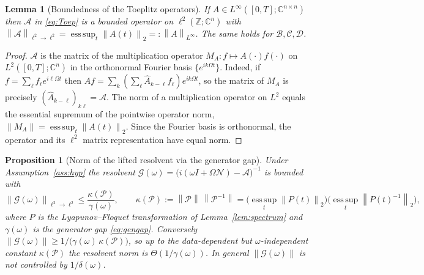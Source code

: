 \documentclass{amsart}
\newtheorem{lemma}{Lemma}
\newtheorem{proposition}{Proposition}
\theoremstyle{definition}
\newcommand{\C}{\mathbb{C}}
\newcommand{\Z}{\mathbb{Z}}
\newcommand{\norm}[1]{\left\lVert#1\right\rVert}
\newcommand{\Acal}{\mathcal{A}}
\newcommand{\Bcal}{\mathcal{B}}
\newcommand{\Ccal}{\mathcal{C}}
\newcommand{\Dcal}{\mathcal{D}}
\newcommand{\Ncal}{\mathcal{N}}
\begin{document}
\begin{lemma}[Boundedness of the Toeplitz operators]\label{lem:bounded}
If $A\in L^\infty([0,T];\C^{n\times n})$ then $\Acal$ in \eqref{eq:Toep} is a
bounded operator on $\ell^2(\Z;\C^n)$ with
$\norm{\Acal}_{\ell^2\to\ell^2}=\operatorname*{ess\,sup}_{t}\norm{A(t)}_2
=:\norm{A}_{L^\infty}$. The same holds for $\Bcal,\Ccal,\Dcal$.
\end{lemma}

\begin{proof}
$\Acal$ is the matrix of the multiplication operator
$M_A:f\mapsto A(\cdot)f(\cdot)$ on $L^2([0,T];\C^n)$ in the orthonormal Fourier
basis $\{e^{ik\Omega t}\}$. Indeed, if $f=\sum_\ell f_\ell e^{i\ell\Omega t}$
then $Af=\sum_k(\sum_\ell\hat A_{k-\ell}f_\ell)e^{ik\Omega t}$, so the matrix of
$M_A$ is precisely $(\hat A_{k-\ell})_{k\ell}=\Acal$. The norm of a
multiplication operator on $L^2$ equals the essential supremum of the pointwise
operator norm, $\norm{M_A}=\operatorname*{ess\,sup}_t\norm{A(t)}_2$. Since the
Fourier basis is orthonormal, the operator and its $\ell^2$ matrix
representation have equal norm.
\end{proof}

\begin{proposition}[Norm of the lifted resolvent via the generator gap]
\label{prop:resnorm}
Under Assumption~\ref{ass:hyp} the resolvent
$\mathcal G(\omega)=\big(i(\omega I+\Omega\Ncal)-\Acal\big)^{-1}$ is bounded with
\begin{equation}\label{eq:resnorm}
\norm{\mathcal G(\omega)}_{\ell^2\to\ell^2}\le \frac{\kappa(\mathcal P)}{\gamma(\omega)},
\qquad
\kappa(\mathcal P):=\norm{\mathcal P}\,\norm{\mathcal P^{-1}}
=\Big(\operatorname*{ess\,sup}_t\norm{P(t)}_2\Big)\Big(\operatorname*{ess\,sup}_t\norm{P(t)^{-1}}_2\Big),
\end{equation}
where $P$ is the Lyapunov--Floquet transformation of Lemma~\ref{lem:spectrum}
and $\gamma(\omega)$ is the generator gap \eqref{eq:gengap}. Conversely
$\norm{\mathcal G(\omega)}\ge 1/\big(\gamma(\omega)\,\kappa(\mathcal P)\big)$, so up to
the data-dependent but $\omega$-independent constant $\kappa(\mathcal P)$ the
resolvent norm is $\Theta(1/\gamma(\omega))$. In general
$\norm{\mathcal G(\omega)}$ is \emph{not} controlled by $1/\delta(\omega)$.
\end{proposition}
\end{document}
